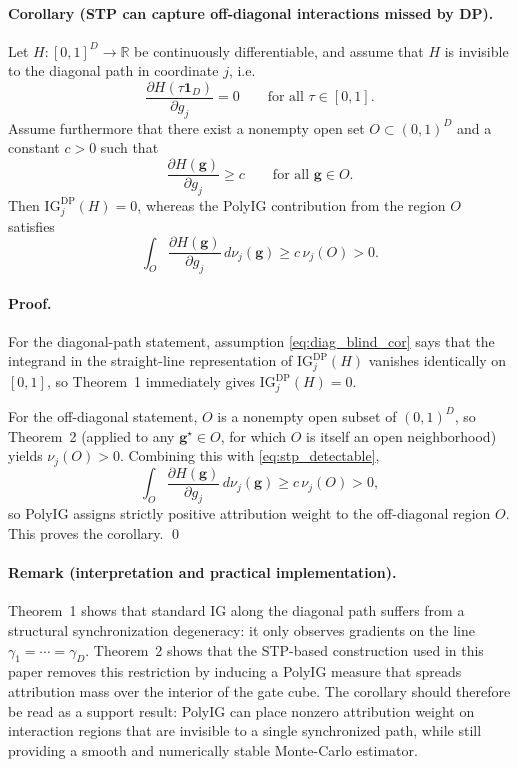 \paragraph{Corollary (STP can capture off-diagonal interactions missed by DP).}
Let $H:[0,1]^D\to\mathbb{R}$ be continuously differentiable, and assume that $H$ is invisible to the diagonal path in coordinate $j$, i.e.
\begin{equation}
\frac{\partial H(\tau\mathbf{1}_D)}{\partial g_j}=0
\qquad
\text{for all }\tau\in[0,1].
\label{eq:diag_blind_cor}
\end{equation}
Assume furthermore that there exist a nonempty open set $O\subset(0,1)^D$ and a constant $c>0$ such that
\begin{equation}
\frac{\partial H(\mathbf{g})}{\partial g_j}\ge c
\qquad
\text{for all }\mathbf{g}\in O.
\label{eq:stp_detectable}
\end{equation}
Then $\mathrm{IG}^{\mathrm{DP}}_j(H)=0$, whereas the PolyIG contribution from the region $O$ satisfies
\[
\int_O \frac{\partial H(\mathbf{g})}{\partial g_j}\,d\nu_j(\mathbf{g})
\ge c\,\nu_j(O)>0.
\]

\paragraph{Proof.}
For the diagonal-path statement, assumption \eqref{eq:diag_blind_cor} says that the integrand in the straight-line representation of $\mathrm{IG}^{\mathrm{DP}}_j(H)$ vanishes identically on $[0,1]$, so Theorem~1 immediately gives $\mathrm{IG}^{\mathrm{DP}}_j(H)=0$.

For the off-diagonal statement, $O$ is a nonempty open subset of $(0,1)^D$, so Theorem~2 (applied to any $\mathbf{g}^{\star}\in O$, for which $O$ is itself an open neighborhood) yields $\nu_j(O)>0$. Combining this with \eqref{eq:stp_detectable},
\[
\int_O \frac{\partial H(\mathbf{g})}{\partial g_j}\,d\nu_j(\mathbf{g})
\ge
c\,\nu_j(O)
>0,
\]
so PolyIG assigns strictly positive attribution weight to the off-diagonal region $O$. This proves the corollary. \qed

\paragraph{Remark (interpretation and practical implementation).}
Theorem~1 shows that standard IG along the diagonal path suffers from a structural synchronization degeneracy: it only observes gradients on the line $\gamma_1=\cdots=\gamma_D$. Theorem~2 shows that the STP-based construction used in this paper removes this restriction by inducing a PolyIG measure that spreads attribution mass over the interior of the gate cube. The corollary should therefore be read as a support result: PolyIG can place nonzero attribution weight on interaction regions that are invisible to a single synchronized path, while still providing a smooth and numerically stable Monte-Carlo estimator.

